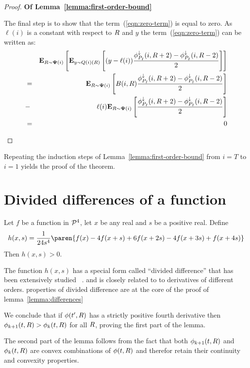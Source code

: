 \documentclass[anon,12pt]{colt2024} %
\begin{document}
\begin{proof} {\bf Of Lemma~\ref{lemma:first-order-bound}}
\begin{enumerate}
The final step is to show that the term~(\ref{eqn:zero-term}) is equal
to zero. As $\ell(i)$ is a constant with respect to $R$ and $y$ the
term~(\ref{eqn:zero-term}) can be written as:
\begin{eqnarray}
&&{\bf E}_{R \sim {\bf \Psi}(i)}\left[ {\bf E}_{y \sim Q(i)(R)}\left[ (y-\ell(i))
   \frac{\phi_{P_I}^{\downarrow}(i,R+2)-\phi_{P_I}^{\downarrow}(i,R-2)}{2} \right] \right]\\
&=&
{\bf E}_{R \sim {\bf \Psi}(i)}\left[ B(i,R)
    \frac{\phi_{P_I}^{\downarrow}(i,R+2)-\phi_{P_I}^{\downarrow}(i,R-2)}{2} \right]\\
  &-& \ell(i) {\bf E}_{R \sim {\bf \Psi}(i)}\left[ 
    \frac{\phi_{P_I}^{\downarrow}(i,R+2)-\phi_{P_I}^{\downarrow}(i,R-2)}{2} \right]\\
  &=& 0
\end{eqnarray}
\end{enumerate}
\end{proof}

Repeating the induction steps of Lemma~\ref{lemma:first-order-bound}
from $i=T$ to $i=1$ yields the proof of the theorem.


\section{Divided differences of a function} \label{sec:divdiff}

\begin{lemma} \label{lemma:differences}
Let $f$ be a function in ${\cal P}^{4}$, let $x$ be any real and $s$ be a positive real. Define
\begin{equation}
  h(x,s) =  \frac{1}{24s^4} \paren{f(x)- 4f(x+s)+ 6f(x+2s)-
    4f(x+3s)+ f(x+4s)}
\end{equation}
Then $h(x,s)>0$.
\end{lemma}

The function $h(x,s)$ has a special form called ``divided difference''
that has been extensively studied ~\cite{popoviciu1965certaines,butt2016generalization, de2005divided}.
and is closely related to to derivatives of different orders. properties of divided difference are at the core of the proof of lemma~\ref{lemma:differences}

\iffalse
We conclude that if $\phi(t',R)$ has a strictly positive fourth
derivative then $\phi_{k+1}(t,R) > \phi_{k}(t,R)$ for all $R$, proving
the first part of the lemma.

The second part of the lemma follows from the fact that
both $\phi_{k+1}(t,R)$ and $\phi_{k}(t,R)$ are convex combinations of
$\phi(t,R)$ and therefor retain their continuity and convexity properties.
\end{document}
